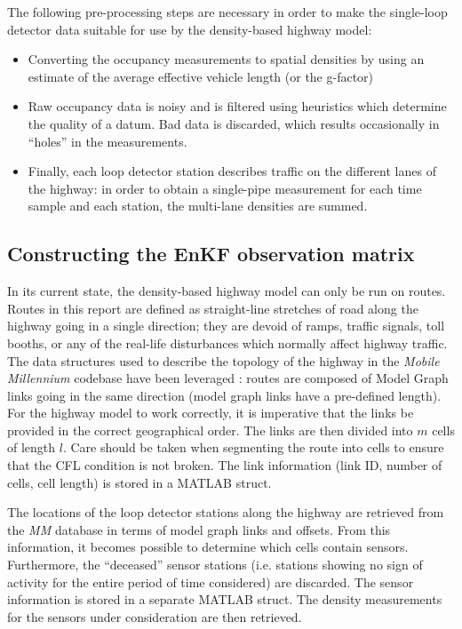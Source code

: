 \documentclass[letterpaper,10pt]{article}
\begin{document}
The following pre-processing steps are necessary in order to make the
single-loop detector data suitable for use by the density-based
highway model:
\begin{itemize}
\item Converting the occupancy measurements to
  spatial densities by using an estimate of the average effective
  vehicle length (or the g-factor)
\item Raw occupancy data is noisy and is filtered using
  heuristics which determine the quality of a datum. Bad data is
  discarded, which results occasionally in ``holes'' in the measurements.
\item Finally, each loop detector station describes
  traffic on the different lanes of the highway: in order to obtain a
  single-pipe measurement for each  time sample and each station, the
  multi-lane densities are summed.
\end{itemize}

\subsection{Constructing the EnKF observation matrix}
In its current state, the density-based highway model can only be run
on routes. Routes in this report are defined as straight-line
stretches of road along the highway going in a single direction; they
are devoid of ramps, traffic signals, toll booths, or any of the
real-life disturbances which normally affect highway traffic.
The data structures used to describe the topology of the highway in
the \emph{Mobile Millennium} codebase have been leveraged : routes
are composed of Model Graph links going in the same direction (model
graph links have a pre-defined length). For the highway model to work
correctly, it is imperative that the links be provided in the correct
geographical order. The links are then divided into $m$ cells of
length $l$. Care should be taken when segmenting the route into cells
to ensure that the CFL condition is not broken. The link information
(link ID, number of cells, cell length) is stored in a MATLAB struct.

The locations of the loop detector stations along the highway are
retrieved from the \emph{MM} database in terms of model graph links
and offsets. From this information, it becomes possible to determine
which cells contain sensors. Furthermore, the ``deceased'' sensor
stations (i.e. stations showing no sign of activity for the entire
period of time considered) are discarded. The sensor information is
stored in a separate MATLAB struct. The density measurements for the
sensors under consideration are then retrieved. 
\end{document}
